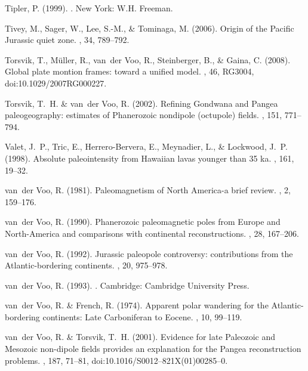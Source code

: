 \documentclass[11pt]{book}
\begin{document}
\begin{thebibliography}{}
Tipler, P. (1999).
.
\newblock New York: W.H. Freeman.

Tivey, M., Sager, W., Lee, S.-M., \& Tominaga, M. (2006).
\newblock Origin of the Pacific Jurassic quiet zone.
, 34, 789--792.

Torsvik, T., M\"uller, R., van~der Voo, R., Steinberger, B., \& Gaina, C.
  (2008).
\newblock Global plate montion frames: toward a unified model.
, 46, RG3004, doi:10.1029/2007RG000227.

Torsvik, T.~H. \& van~der Voo, R. (2002).
\newblock Refining Gondwana and Pangea paleogeography: estimates of Phanerozoic
  nondipole (octupole) fields.
, 151, 771--794.

Valet, J.~P., Tric, E., Herrero-Bervera, E., Meynadier, L., \& Lockwood, J.~P.
  (1998).
\newblock Absolute paleointensity from Hawaiian lavas younger than 35 ka.
, 161, 19--32.

van~der Voo, R. (1981).
\newblock Paleomagnetism of North America-a brief review.
, 2, 159--176.

van~der Voo, R. (1990).
\newblock Phanerozoic paleomagnetic poles from Europe and North-America and
  comparisons with continental reconstructions.
, 28, 167--206.

van~der Voo, R. (1992).
\newblock Jurassic paleopole controversy: contributions from the
  Atlantic-bordering continents.
, 20, 975--978.

van~der Voo, R. (1993).
.
\newblock Cambridge: Cambridge University Press.

van~der Voo, R. \& French, R. (1974).
\newblock Apparent polar wandering for the Atlantic-bordering continents: Late
  Carboniferan to Eocene.
, 10, 99--119.

van~der Voo, R. \& Torsvik, T.~H. (2001).
\newblock Evidence for late Paleozoic and Mesozoic non-dipole fields provides
  an explanation for the Pangea reconstruction problems.
, 187, 71--81,
  doi:10.1016/S0012--821X(01)00285--0.


\end{thebibliography}
\end{document}
